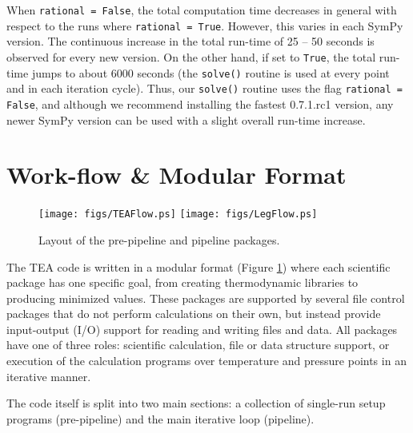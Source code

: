  When \texttt{rational = False}, the total computation time decreases
  in general with respect to the runs where \texttt{rational =
  True}. However, this varies in each SymPy version. The continuous
  increase in the total run-time of 25 -- 50 seconds is observed for
  every new version. On the other hand, if set to \texttt{True}, the
  total run-time jumps to about 6000 seconds (the \texttt{solve()}
  routine is used at every  point and in each iteration
  cycle). Thus, our \texttt{solve()} routine uses the
  flag \texttt{rational = False}, and although we recommend installing
  the fastest 0.7.1.rc1 version, any newer SymPy version can be used
  with a slight overall run-time increase.


\section{Work-flow \& Modular Format}
\label{flow}


\begin{figure}[!h]
    \centering
    \texttt{[image: figs/TEAFlow.ps]}
    \texttt{[image: figs/LegFlow.ps]}
\caption{Layout of the pre-pipeline and pipeline packages.}
\label{fig:TEAflow}
\end{figure}


  The TEA code is written in a modular format
  (Figure \ref{fig:TEAflow}) where each scientific package has one
  specific goal, from creating thermodynamic libraries to producing
  minimized values.  These packages are supported by several file
  control packages that do not perform calculations on their own, but
  instead provide input-output (I/O) support for reading and writing
  files and data.  All packages have one of three roles: scientific
  calculation, file or data structure support, or execution of the
  calculation programs over temperature and pressure points in an
  iterative manner.

  The code itself is split into two main sections: a collection of
  single-run setup programs (pre-pipeline) and the main iterative loop
  (pipeline).


